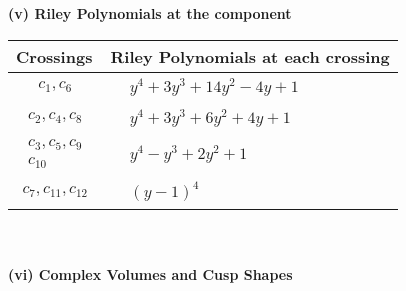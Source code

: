 \documentclass[1p]{elsarticle_modified}
\theoremstyle{definition}
\begin{document}
\newpage\renewcommand{\arraystretch}{1}
\flushleft \textbf{(v) Riley Polynomials at the component}\newline \\
\begin{tabular}{m{50pt}|m{274pt}}
Crossings & \hspace{64pt}Riley Polynomials at each crossing \\
\hline $$\begin{aligned}c_{1},c_{6}\end{aligned}$$&$\begin{aligned}
&y^4+3 y^3+14 y^2-4 y+1
\end{aligned}$\\
\hline $$\begin{aligned}c_{2},c_{4},c_{8}\end{aligned}$$&$\begin{aligned}
&y^4+3 y^3+6 y^2+4 y+1
\end{aligned}$\\
\hline $$\begin{aligned}c_{3},c_{5},c_{9}\\c_{10}\end{aligned}$$&$\begin{aligned}
&y^4- y^3+2 y^2+1
\end{aligned}$\\
\hline $$\begin{aligned}c_{7},c_{11},c_{12}\end{aligned}$$&$\begin{aligned}
&(y-1)^4
\end{aligned}$\\
\hline
\end{tabular}\\~\\
\newpage\flushleft \textbf{(vi) Complex Volumes and Cusp Shapes}
\end{document}
